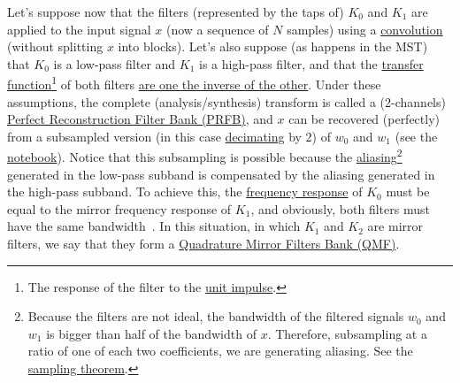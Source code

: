 Let's suppose now that the filters (represented by the taps of) $K_0$
and $K_1$ are applied to the input signal $x$ (now a sequence of $N$
samples) using a
\href{https://en.wikipedia.org/wiki/Kernel_(image_processing)}{convolution}
(without splitting $x$ into blocks). Let's also suppose (as happens in
the MST) that $K_0$ is a low-pass filter and $K_1$ is a high-pass
filter, and that the
\href{https://en.wikipedia.org/wiki/Filter_(signal_processing)#The_transfer_function}{transfer
  function}\footnote{The response of the filter to the
  \href{https://en.wikipedia.org/?title=Unit_impulse&redirect=no}{unit
    impulse}.} of both filters
\href{https://en.wikipedia.org/wiki/Filter_bank#Perfect_reconstruction_filter_banks}{are
  one the inverse of the other}. Under these assumptions, the complete
(analysis/synthesis) transform is called a (2-channels)
\href{https://en.wikipedia.org/wiki/Filter_bank#Perfect_reconstruction_filter_banks}{Perfect
  Reconstruction Filter Bank (PRFB)}, and $x$ can be recovered
(perfectly) from a subsampled version (in this case
\href{https://en.wikipedia.org/wiki/Downsampling_(signal_processing)}{decimating}
by 2) of $w_0$ and $w_1$ (see the
\href{https://github.com/Tecnologias-multimedia/intercom/blob/master/docs/PRFB.ipynb}{notebook}). Notice
that this subsampling is possible because the
\href{https://en.wikipedia.org/wiki/Aliasing}{aliasing}\footnote{Because
  the filters are not ideal, the bandwidth of the filtered signals
  $w_0$ and $w_1$ is bigger than half of the bandwidth of
  $x$. Therefore, subsampling at a ratio of one of each two
  coefficients, we are generating aliasing. See the
  \href{https://en.wikipedia.org/wiki/Nyquist-Shannon_sampling_theorem}{sampling
    theorem}.}  generated in the low-pass subband is compensated by
the aliasing generated in the high-pass subband. To achieve this, the
\href{https://en.wikipedia.org/wiki/Filter_(signal_processing)#The_transfer_function}{frequency
  response} of $K_0$ must be equal to the mirror frequency response of
$K_1$, and obviously, both filters must have the same
bandwidth~\cite{sayood2017introduction}. In this situation, in which
$K_1$ and $K_2$ are mirror filters, we say that they form a
\href{https://en.wikipedia.org/wiki/Quadrature_mirror_filter}{Quadrature
  Mirror Filters Bank (QMF)}.

